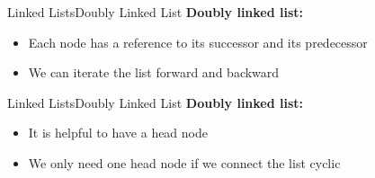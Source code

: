 
\begin{frame}{Linked Lists}{Doubly Linked List}
  \textbf{Doubly linked list:}
  \begin{itemize}
    \item
      Each node has a reference to its successor and its
      {\color{Mittel-Blau}predecessor}
    \item
      We can iterate the list forward and backward
  \end{itemize}
  \begin{flushleft}
    
  \end{flushleft}
\end{frame}


\begin{frame}{Linked Lists}{Doubly Linked List}
  \textbf{Doubly linked list:}
  \begin{itemize}
    \item
      It is helpful to have a {\color{Mittel-Blau}head} node
    \item
      We only need {\color{Mittel-Blau}one head} node if we connect the list
      cyclic
  \end{itemize}
  \begin{flushleft}
    
  \end{flushleft}
\end{frame}


